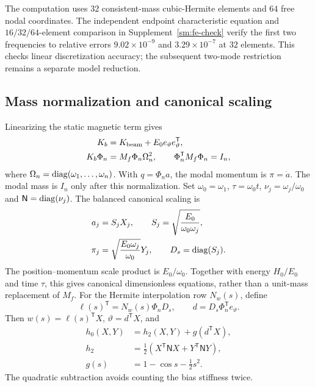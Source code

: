 The computation uses $32$ consistent-mass cubic-Hermite elements and
$64$ free nodal coordinates. The independent endpoint characteristic
equation and $16/32/64$-element comparison in
Supplement~\ref{sm:fe-check} verify the first two frequencies to relative
errors $9.02\times10^{-9}$ and $3.29\times10^{-7}$ at $32$ elements.
This checks linear discretization accuracy; the subsequent two-mode
restriction remains a separate model reduction.

\subsection{Mass normalization and canonical scaling}
\label{mech:canonical}
Linearizing the static magnetic term gives
\begin{align}
 K_b&=K_{\rm beam}+E_0e_\vartheta e_\vartheta^{\mathsf T},\nonumber\\
 K_b\Phi_n&=M_f\Phi_n\Omega_n^2,\qquad
 \Phi_n^{\mathsf T}M_f\Phi_n=I_n,
 \label{mech:modal-bias}
\end{align}
where $\Omega_n=\operatorname{diag}(\omega_1,\ldots,\omega_n)$.
With $q=\Phi_na$, the modal momentum is $\pi=\dot a$.
The modal mass is $I_n$ only after this normalization.
Set $\omega_0=\omega_1$, $\tau=\omega_0t$,
$\nu_j=\omega_j/\omega_0$ and $\mathsf N=\operatorname{diag}(\nu_j)$.
The balanced canonical scaling is
\begin{align}
 a_j&=S_jX_j,\qquad S_j=\sqrt{\frac{E_0}{\omega_0\omega_j}},\nonumber\\
 \pi_j&=\sqrt{\frac{E_0\omega_j}{\omega_0}}Y_j,
 \qquad D_s=\operatorname{diag}(S_j).
 \label{mech:scaling}
\end{align}
The position--momentum scale product is $E_0/\omega_0$.
Together with energy $H_0/E_0$ and time $\tau$, this gives canonical
dimensionless equations, rather than a unit-mass replacement of $M_f$.
For the Hermite interpolation row $N_w(s)$, define
\begin{equation}
 \ell(s)^{\mathsf T}=N_w(s)\Phi_nD_s,\qquad
 d=D_s\Phi_n^{\mathsf T}e_\vartheta.
 \label{mech:shape-maps}
\end{equation}
Then $w(s)=\ell(s)^{\mathsf T}X$, $\vartheta=d^{\mathsf T}X$, and
\begin{align}
 h_0(X,Y)&=h_2(X,Y)+g(d^{\mathsf T}X),\nonumber\\
 h_2&=\tfrac12(X^{\mathsf T}\mathsf NX+Y^{\mathsf T}\mathsf NY),\nonumber\\
 g(s)&=1-\cos s-\tfrac12s^2.
 \label{mech:nominal-energy}
\end{align}
The quadratic subtraction avoids counting the bias stiffness twice.

